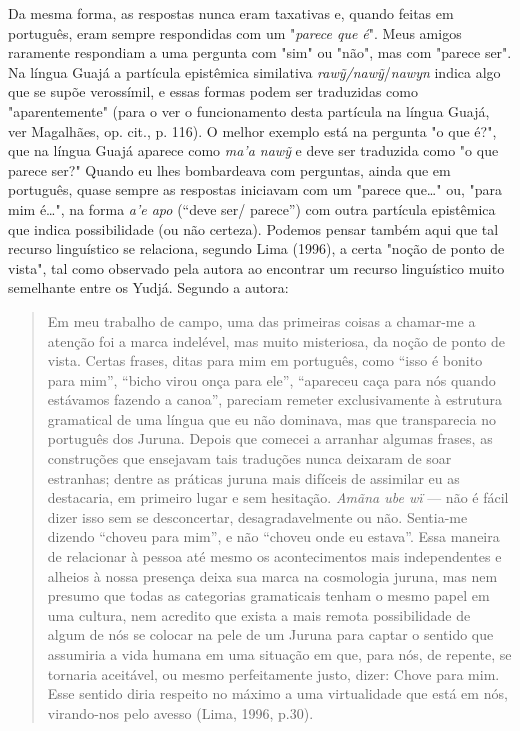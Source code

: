 Da mesma forma, as respostas nunca eram taxativas e, quando feitas em
português, eram sempre respondidas com um "\emph{parece que é}". Meus
amigos raramente respondiam a uma pergunta com "sim" ou "não", mas com
"parece ser". Na língua Guajá a partícula epistêmica similativa
\emph{rawỹ/nawỹ}/\emph{nawyn} indica algo que se supõe verossímil, e
essas formas podem ser traduzidas como "aparentemente" (para o ver o
funcionamento desta partícula na língua Guajá, ver Magalhães, op. cit.,
p. 116). O melhor exemplo está na pergunta "o que é?", que na língua
Guajá aparece como \emph{ma'a nawỹ} e deve ser traduzida como "o que
parece ser?" Quando eu lhes bombardeava com perguntas, ainda que em
português, quase sempre as respostas iniciavam com um "parece que\ldots{}"
ou, "para mim é\ldots{}", na forma \emph{a'e apo} (``deve ser/ parece'') com
outra partícula epistêmica que indica possibilidade (ou não certeza).
Podemos pensar também aqui que tal recurso linguístico se relaciona,
segundo Lima (1996), a certa "noção de ponto de vista", tal como
observado pela autora ao encontrar um recurso linguístico muito
semelhante entre os Yudjá. Segundo a autora:

\begin{quote}
Em meu trabalho de campo, uma das primeiras coisas a chamar-me a atenção
foi a marca indelével, mas muito misteriosa, da noção de ponto de vista.
Certas frases, ditas para mim em português, como ``isso é bonito para
mim'', ``bicho virou onça para ele'', ``apareceu caça para nós quando
estávamos fazendo a canoa'', pareciam remeter exclusivamente à estrutura
gramatical de uma língua que eu não dominava, mas que transparecia no
português dos Juruna. Depois que comecei a arranhar algumas frases, as
construções que ensejavam tais traduções nunca deixaram de soar
estranhas; dentre as práticas juruna mais difíceis de assimilar eu as
destacaria, em primeiro lugar e sem hesitação. \emph{Amãna ube wï} ---
não é fácil dizer isso sem se desconcertar, desagradavelmente ou não.
Sentia-me dizendo ``choveu para mim'', e não ``choveu onde eu estava''.
Essa maneira de relacionar à pessoa até mesmo os acontecimentos mais
independentes e alheios à nossa presença deixa sua marca na cosmologia
juruna, mas nem presumo que todas as categorias gramaticais tenham o
mesmo papel em uma cultura, nem acredito que exista a mais remota
possibilidade de algum de nós se colocar na pele de um Juruna para
captar o sentido que assumiria a vida humana em uma situação em que,
para nós, de repente, se tornaria aceitável, ou mesmo perfeitamente
justo, dizer: Chove para mim. Esse sentido diria respeito no máximo a
uma virtualidade que está em nós, virando-nos pelo avesso (Lima, 1996,
p.30).
\end{quote}

